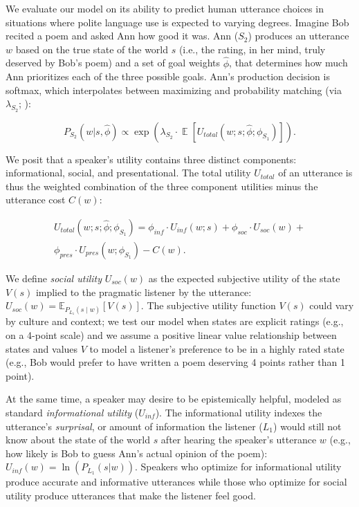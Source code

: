 \documentclass[9pt,twocolumn,twoside,lineno]{main_class_file}
\begin{document}
We evaluate our model on its ability to predict human utterance choices
in situations where polite language use is expected to varying degrees.
Imagine Bob recited a poem and asked Ann how good it was.
Ann (\(S_2\)) produces an utterance \(w\) based on the true state of the world \(s\) (i.e., the
rating, in her mind, truly deserved by Bob's poem) and a set of goal weights
\(\hat{\phi}\), that determines how much Ann prioritizes each of the three possible goals.
Ann's production decision is softmax, which interpolates between
maximizing and probability matching (via \(\lambda_{S_2}\); \cite{goodman2013}):

\begin{equation}
P_{S_2}(w | s, \hat{\phi}) \propto \exp(\lambda_{S_2} \cdot \mathop{\mathbb{E}}[U_{total}(w; s; \hat{\phi}; \phi_{S_1})]).
\end{equation}

We posit that a speaker's utility contains three distinct components: informational, social, and presentational. The
total utility $U_{total}$ of an utterance is thus the weighted combination of the three component utilities minus the utterance cost \(C(w)\):

\begin{equation}
\begin{split}
U_{total}(w; s; \hat{\phi}; \phi_{S_1}) = \phi_{inf} \cdot U_{inf}(w; s) + \phi_{soc} \cdot U_{soc}(w) + \\ \phi_{pres} \cdot U_{pres}(w; \phi_{S_1}) - C(w).
\end{split}
\end{equation}

We define \emph{social utility} \(U_{soc}(w)\) as the expected subjective utility of the state \(V(s)\) implied to the
pragmatic listener by the utterance: \(U_{soc}(w) = \mathbb{E}_{P_{L_1}(s \mid w)}[V(s)]\).
The subjective utility function \(V(s)\) could vary by culture and context; we test our model when states are explicit ratings (e.g., on a 4-point scale) and we assume a positive linear value relationship between states and values \(V\) to model a listener's preference to be in a highly rated state (e.g., Bob would prefer to have written a poem deserving 4 points rather than 1 point).

At the same time, a speaker may desire to be epistemically helpful, modeled as standard \emph{informational utility} (\(U_{inf}\)).
The informational utility indexes the utterance's \emph{surprisal}, or amount of information the listener (\(L_1\)) would still not know about the state of the world \(s\) after hearing the speaker's utterance \(w\) (e.g., how likely is Bob to guess Ann's actual opinion of the poem): \(U_{inf}(w) = \ln(P_{L_1}(s | w))\).
Speakers who optimize for informational utility produce accurate and informative utterances while those who optimize for social utility produce utterances that make the listener feel good.
\end{document}
